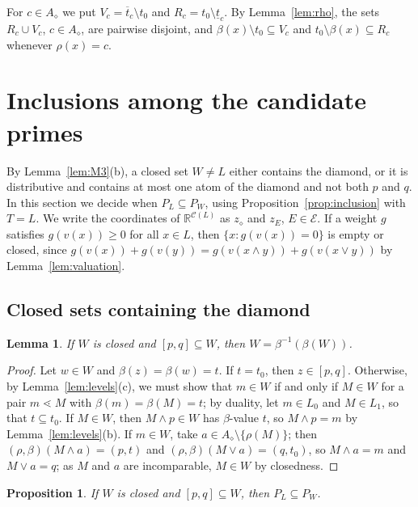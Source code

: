 \documentclass{amsart}
\newtheorem{lemma}[theorem]{Lemma}
\newtheorem{proposition}[theorem]{Proposition}
\theoremstyle{definition}
\newcommand{\cC}{\mathcal C}
\newcommand{\cE}{\mathcal E}
\newcommand{\R}{\mathbb R}
\newcommand{\dm}{\diamond}
\newcommand{\lt}{\underline{t}}
\newcommand{\ut}{\overline{t}}
\begin{document}
For $c\in A_\dm$ we put $V_c=\ut_c\setminus t_0$ and $R_c=t_0\setminus\lt_c$. By Lemma~\ref{lem:rho}, the sets $R_c\cup V_c$, $c\in A_\dm$, are pairwise disjoint, and $\beta(x)\setminus t_0\subseteq V_c$ and $t_0\setminus\beta(x)\subseteq R_c$ whenever $\rho(x)=c$.

\section{Inclusions among the candidate primes}\label{sec:inclusions}

By Lemma~\ref{lem:M3}(b), a closed set $W\ne L$ either contains the diamond, or it is distributive and contains at most one atom of the diamond and not both $p$ and $q$. In this section we decide when $P_L\subseteq P_W$, using Proposition~\ref{prop:inclusion} with $T=L$. We write the coordinates of $\R^{\cC(L)}$ as $z_\dm$ and $z_E$, $E\in\cE$. If a weight $g$ satisfies $g(v(x))\ge0$ for all $x\in L$, then $\{x:g(v(x))=0\}$ is empty or closed, since $g(v(x))+g(v(y))=g(v(x\wedge y))+g(v(x\vee y))$ by Lemma~\ref{lem:valuation}.

\subsection{Closed sets containing the diamond}

\begin{lemma}\label{lem:saturation}
If $W$ is closed and $[p,q]\subseteq W$, then $W=\beta^{-1}(\beta(W))$.
\end{lemma}

\begin{proof}
Let $w\in W$ and $\beta(z)=\beta(w)=t$. If $t=t_0$, then $z\in[p,q]$. Otherwise, by Lemma~\ref{lem:levels}(c), we must show that $m\in W$ if and only if $M\in W$ for a pair $m\lessdot M$ with $\beta(m)=\beta(M)=t$; by duality, let $m\in L_0$ and $M\in L_1$, so that $t\subseteq t_0$. If $M\in W$, then $M\wedge p\in W$ has $\beta$-value $t$, so $M\wedge p=m$ by Lemma~\ref{lem:levels}(b). If $m\in W$, take $a\in A_\dm\setminus\{\rho(M)\}$; then $(\rho,\beta)(M\wedge a)=(p,t)$ and $(\rho,\beta)(M\vee a)=(q,t_0)$, so $M\wedge a=m$ and $M\vee a=q$; as $M$ and $a$ are incomparable, $M\in W$ by closedness.
\end{proof}

\begin{proposition}\label{prop:diamondinclusion}
If $W$ is closed and $[p,q]\subseteq W$, then $P_L\subseteq P_W$.
\end{proposition}
\end{document}
